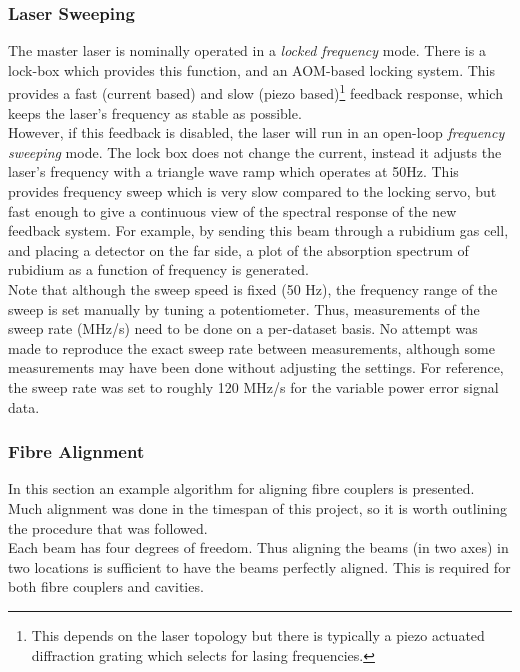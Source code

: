     \subsubsection{Laser Sweeping}

The master laser is nominally operated in a \emph{locked frequency} mode.  There is a lock-box which provides this function, and an AOM-based locking system.  This provides a fast (current based) and slow (piezo based)\footnote{This depends on the laser topology but there is typically a piezo actuated diffraction grating which selects for lasing frequencies.} feedback response, which keeps the laser's frequency as stable as possible. \\

However, if this feedback is disabled, the laser will run in an open-loop \emph{frequency sweeping} mode.  The lock box does not change the current, instead it adjusts the laser's frequency with a triangle wave ramp which operates at 50Hz.  This provides frequency sweep which is very slow compared to the locking servo, but fast enough to give a continuous view of the spectral response of the new feedback system.  For example, by sending this beam through a rubidium gas cell, and placing a detector on the far side, a plot of the absorption spectrum of rubidium as a function of frequency is generated. \\

Note that although the sweep speed is fixed (50 Hz), the frequency range of the sweep is set manually by tuning a potentiometer.  Thus, measurements of the sweep rate (MHz/s) need to be done on a per-dataset basis.  No attempt was made to reproduce the exact sweep rate between measurements, although some measurements may have been done without adjusting the settings.  For reference, the sweep rate was set to roughly 120 MHz/s for the variable power error signal data.

    \subsubsection{Fibre Alignment}

In this section an  example algorithm for aligning fibre couplers is presented.  Much alignment was done in the timespan of this project, so it is worth outlining the procedure that was followed. \\

Each beam has four degrees of freedom.  Thus aligning the beams (in two axes) in two locations is sufficient to have the beams perfectly aligned.  This is required for both fibre couplers and cavities. \\

